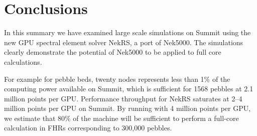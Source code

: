 \documentclass{anstrans}
\begin{document}
\begin{table}
 \caption{NekRS GPU/CPU strong-scale timings (seconds per step) for 100 steps
of turbulent flow simulations with $Re=10000$ for 1568-Pebble case using total
number of grid points $n=179,864,398$ ($E=524,386$ and $N=7$).}
 \label{tab:nekrs1}
\end{table}

\section{Conclusions}

In this summary we have examined large scale simulations on Summit using the
new GPU spectral element solver NekRS, a port of Nek5000. The simulations
clearly demonstrate the potential of Nek5000 to be applied to full core
calculations.

\medskip
For example for pebble beds, twenty nodes represents less than 1\% of the
computing power available on Summit, which is sufficient for 1568 pebbles at
2.1 million points per GPU. Performance throughput for NekRS saturates at 2--4
million points per GPU on Summit. By running with 4 million points per GPU, we
estimate that 80\% of the machine will be sufficient to perform a full-core
calculation in FHRs corresponding to 300,000 pebbles.



\end{document}
